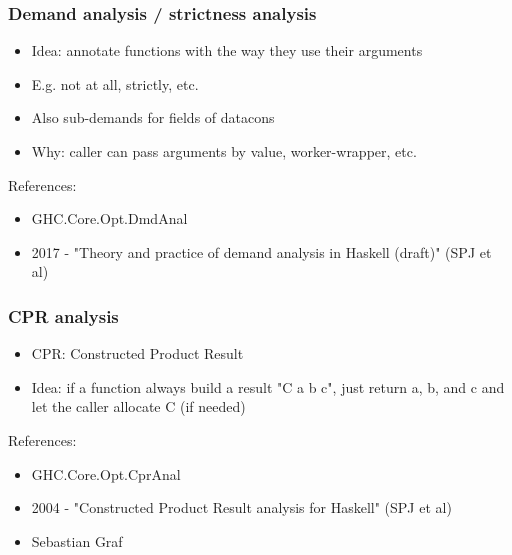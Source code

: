 \documentclass[aspectratio=169]{beamer}
\begin{document}
\begin{frame}
  \frametitle{Demand analysis / strictness analysis}

  \begin{itemize}
    \item Idea: annotate functions with the way they use their arguments
    \item E.g. not at all, strictly, etc.
    \item Also sub-demands for fields of datacons
    \item Why: caller can pass arguments by value, worker-wrapper, etc.
  \end{itemize}

  References:
  \begin{itemize}
    \item GHC.Core.Opt.DmdAnal
    \item 2017 - "Theory and practice of demand analysis in Haskell (draft)"
      (SPJ et al)
  \end{itemize}
\end{frame}

\begin{frame}
  \frametitle{CPR analysis}
  \begin{itemize}
    \item CPR: Constructed Product Result
    \item Idea: if a function always build a result "C a b c", just return a, b,
      and c and let the caller allocate C (if needed)
  \end{itemize}

  References:
  \begin{itemize}
    \item GHC.Core.Opt.CprAnal
    \item 2004 - "Constructed Product Result analysis for Haskell" (SPJ et al)
    \item Sebastian Graf
  \end{itemize}
\end{frame}
\end{document}
